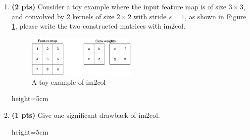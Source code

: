 \begin{enumerate}[label=\alph*.]
\item \textbf{(2 pts)} Consider a toy example where the input feature map is of size $3\times3$, and convolved by 2 kernels of size $2\times2$ with stride $s=1$, as shown in Figure \ref{fig:toy_im2col}, please write the two constructed matrices with im2col.

\begin{figure}[H]
    \centering
    \includegraphics[width=0.5\textwidth]{images/im2col_toy_sample.pdf}
    \caption{A toy example of im2col}
    \label{fig:toy_im2col}
\end{figure}


\begin{soln}{height=5cm}
\FourCA
\end{soln}

\item \textbf{(1 pts)} Give one significant drawback of im2col.

\begin{soln}{height=5cm}
\FourCB
\end{soln}

\end{enumerate}